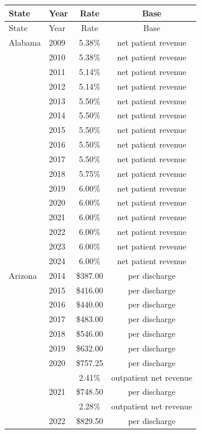 \begin{longtable}{llcc}
\toprule
State & Year & Rate & Base \\
\midrule
\endfirsthead
\toprule
State & Year & Rate & Base \\
\midrule
\endhead
\bottomrule
\endlastfoot
Alabama & 2009 & 5.38\% & net patient revenue \\[0pt]
 & 2010 & 5.38\% & net patient revenue \\[0pt]
 & 2011 & 5.14\% & net patient revenue \\[0pt]
 & 2012 & 5.14\% & net patient revenue \\[0pt]
 & 2013 & 5.50\% & net patient revenue \\[0pt]
 & 2014 & 5.50\% & net patient revenue \\[0pt]
 & 2015 & 5.50\% & net patient revenue \\[0pt]
 & 2016 & 5.50\% & net patient revenue \\[0pt]
 & 2017 & 5.50\% & net patient revenue \\[0pt]
 & 2018 & 5.75\% & net patient revenue \\[0pt]
 & 2019 & 6.00\% & net patient revenue \\[0pt]
 & 2020 & 6.00\% & net patient revenue \\[0pt]
 & 2021 & 6.00\% & net patient revenue \\[0pt]
 & 2022 & 6.00\% & net patient revenue \\[0pt]
 & 2023 & 6.00\% & net patient revenue \\[0pt]
 & 2024 & 6.00\% & net patient revenue \\[0pt]
\midrule
Arizona & 2014 & \$387.00 & per discharge \\[0pt]
 & 2015 & \$416.00 & per discharge \\[0pt]
 & 2016 & \$440.00 & per discharge \\[0pt]
 & 2017 & \$483.00 & per discharge \\[0pt]
 & 2018 & \$546.00 & per discharge \\[0pt]
 & 2019 & \$632.00 & per discharge \\[0pt]
 & 2020 & \$757.25 & per discharge \\[0pt]
 &  & 2.41\% & outpatient net revenue \\[0pt]
 & 2021 & \$748.50 & per discharge \\[0pt]
 &  & 2.28\% & outpatient net revenue \\[0pt]
 & 2022 & \$829.50 & per discharge \\[0pt]

\end{longtable}
